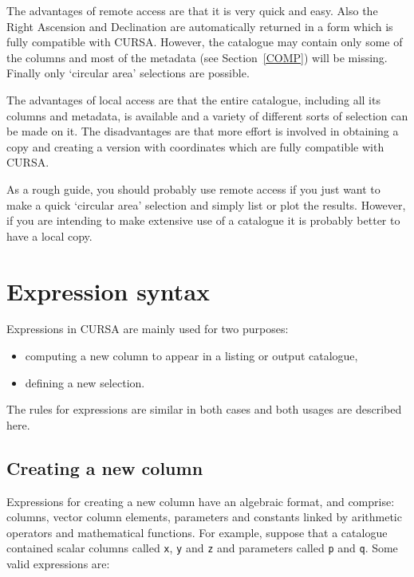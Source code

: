 \documentclass[twoside,11pt]{starlink}
\begin{document}
The advantages of remote access are that it is very quick and easy.
Also the Right Ascension and Declination are automatically returned in
a form which is fully compatible with CURSA.  However, the catalogue
may contain only some of the columns and most of the metadata (see
Section~\ref{COMP}) will be missing.  Finally only `circular area'
selections are possible.

The advantages of local access are that the entire catalogue, including all
its columns and metadata, is available and a variety of different sorts
of selection can be made on it.  The disadvantages are that more effort
is involved in obtaining a copy and creating a version with coordinates
which are fully compatible with CURSA.

As a rough guide, you should probably use remote access if you just want
to make a quick `circular area' selection and simply list or plot the
results.  However, if you are intending to make extensive use of a
catalogue it is probably better to have a local copy.


\newpage
\appendix

\section{\label{EXPR}Expression syntax}

Expressions in CURSA are mainly used for two purposes:

\begin{itemize}

  \item computing a new column to appear in a listing or output
   catalogue,

  \item defining a new selection.

\end{itemize}

The rules for expressions are similar in both cases and both usages are
described here.

\subsection{Creating a new column}

Expressions for creating a new column have an algebraic format, and comprise:
columns, vector column elements, parameters and constants linked by
arithmetic operators and mathematical functions. For example, suppose that
a catalogue contained scalar columns called \texttt{x}, \texttt{y} and \texttt{z}
and parameters called \texttt{p} and \texttt{q}.  Some valid expressions are:
\end{document}

